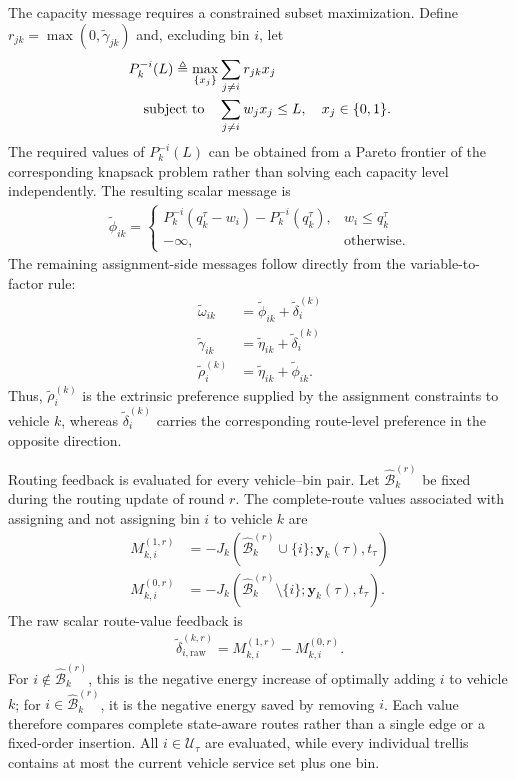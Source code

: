 The capacity message requires a constrained subset maximization. Define $r_{jk}=\max(0,\widetilde{\gamma}_{jk})$ and, excluding bin $i$, let
\begin{align}
    P_k^{-i}(L)
    \triangleq
    \max_{\{x_j\}}
    &\sum_{j\neq i}r_{jk}x_j \notag\\
    \text{subject to}\quad
    &\sum_{j\neq i}w_jx_j\leq L,\quad x_j\in\{0,1\}.
    \label{eq:pareto-subproblem}
\end{align}
The required values of $P_k^{-i}(L)$ can be obtained from a Pareto frontier of the corresponding knapsack problem rather than solving each capacity level independently. The resulting scalar message is
\begin{align}
\widetilde{\phi}_{ik}=
\begin{cases}
P_k^{-i}(q_k^\tau-w_i)-P_k^{-i}(q_k^\tau), & w_i\leq q_k^\tau\\
-\infty, & \text{otherwise}.
\end{cases}
\label{eq:phi-update}
\end{align}
The remaining assignment-side messages follow directly from the variable-to-factor rule:
\begin{align}
    \widetilde{\omega}_{ik}
    &=\widetilde{\phi}_{ik}+\widetilde{\delta}_i^{(k)}\\
    \widetilde{\gamma}_{ik}
    &=\widetilde{\eta}_{ik}+\widetilde{\delta}_i^{(k)}\\
    \widetilde{\rho}_i^{(k)}
    &=\widetilde{\eta}_{ik}+\widetilde{\phi}_{ik}.
    \label{eq:scalar-assignment-updates}
\end{align}
Thus, $\widetilde{\rho}_i^{(k)}$ is the extrinsic preference supplied by the assignment constraints to vehicle $k$, whereas $\widetilde{\delta}_i^{(k)}$ carries the corresponding route-level preference in the opposite direction.

Routing feedback is evaluated for every vehicle--bin pair. Let $\widehat{\mathcal B}_k^{(r)}$ be fixed during the routing update of round $r$. The complete-route values associated with assigning and not assigning bin $i$ to vehicle $k$ are
\begin{align}
 M_{k,i}^{(1,r)}
 &=-J_k\!\left(\widehat{\mathcal B}_k^{(r)}\cup\{i\};
                \mathbf y_k(\tau),t_\tau\right)\\
 M_{k,i}^{(0,r)}
 &=-J_k\!\left(\widehat{\mathcal B}_k^{(r)}\setminus\{i\};
                \mathbf y_k(\tau),t_\tau\right).
 \label{eq:assigned-set-max-marginals}
\end{align}
The raw scalar route-value feedback is
\begin{align}
 \widetilde\delta_{i,\mathrm{raw}}^{(k,r)}
 =M_{k,i}^{(1,r)}-M_{k,i}^{(0,r)}.
 \label{eq:assigned-set-delta}
\end{align}
For $i\notin\widehat{\mathcal B}_k^{(r)}$, this is the negative energy increase of optimally adding $i$ to vehicle $k$; for $i\in\widehat{\mathcal B}_k^{(r)}$, it is the negative energy saved by removing $i$. Each value therefore compares complete state-aware routes rather than a single edge or a fixed-order insertion. All $i\in\mathcal U_\tau$ are evaluated, while every individual trellis contains at most the current vehicle service set plus one bin.

